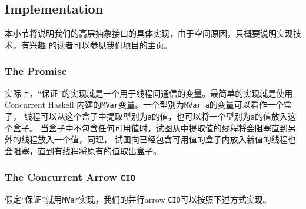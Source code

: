 \documentclass[conference]{IEEEtran}
\begin{document}
\subsection{Implementation}\label{subsec:implementation}
本小节将说明我们的高层抽象接口的具体实现，由于空间原因，只概要说明实现技术，有兴趣
的读者可以参见我们项目的主页。\cite{CIOHomepage}

\subsubsection{The Promise}
实际上，“保证”的实现就是一个用于线程间通信的变量。最简单的实现就是使用Concurrent Haskell
\cite{Jones1996}内建的\texttt{MVar}变量。一个型别为\texttt{MVar a}的变量可以看作一个盒子，
线程可以从这个盒子中提取型别为\texttt{a}的值，也可以将一个型别为\texttt{a}的值放入这个盒子。
当盒子中不包含任何可用值时，试图从中提取值的线程将会阻塞直到另外的线程放入一个值，同理，
试图向已经包含可用值的盒子内放入新值的线程也会阻塞，直到有线程将原有的值取出盒子。

\subsubsection{The Concurrent Arrow \texttt{CIO}}
假定“保证”就用\texttt{MVar}实现，我们的并行arrow \texttt{CIO}可以按照下述方式实现。
\end{document}
